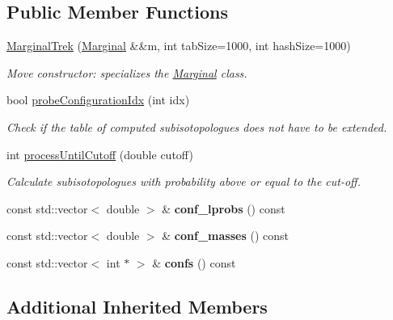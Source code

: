 \subsection*{Public Member Functions}
\begin{DoxyCompactItemize}
\item 
\mbox{\hyperlink{class_iso_spec_1_1_marginal_trek_a83e70d522174e4e6724116941fd9c99e}{Marginal\+Trek}} (\mbox{\hyperlink{class_iso_spec_1_1_marginal}{Marginal}} \&\&m, int tab\+Size=1000, int hash\+Size=1000)
\begin{DoxyCompactList}\small\item\em Move constructor\+: specializes the \mbox{\hyperlink{class_iso_spec_1_1_marginal}{Marginal}} class. \end{DoxyCompactList}\item 
bool \mbox{\hyperlink{class_iso_spec_1_1_marginal_trek_a4db6041328b818d123a017dda3c8b8ae}{probe\+Configuration\+Idx}} (int idx)
\begin{DoxyCompactList}\small\item\em Check if the table of computed subisotopologues does not have to be extended. \end{DoxyCompactList}\item 
int \mbox{\hyperlink{class_iso_spec_1_1_marginal_trek_a04f3e495a805a3ea242059c963c5b129}{process\+Until\+Cutoff}} (double cutoff)
\begin{DoxyCompactList}\small\item\em Calculate subisotopologues with probability above or equal to the cut-\/off. \end{DoxyCompactList}\item 
\mbox{\label{class_iso_spec_1_1_marginal_trek_a802aa5dfd06d560b4f867240bb6c9d10}} 
const std\+::vector$<$ double $>$ \& {\bfseries conf\+\_\+lprobs} () const
\item 
\mbox{\label{class_iso_spec_1_1_marginal_trek_a8b31b886749c0bb07756ae367a4c31cd}} 
const std\+::vector$<$ double $>$ \& {\bfseries conf\+\_\+masses} () const
\item 
\mbox{\label{class_iso_spec_1_1_marginal_trek_a05df43d45dda1a7f80b711eec016c40c}} 
const std\+::vector$<$ int $\ast$ $>$ \& {\bfseries confs} () const
\end{DoxyCompactItemize}
\subsection*{Additional Inherited Members}


